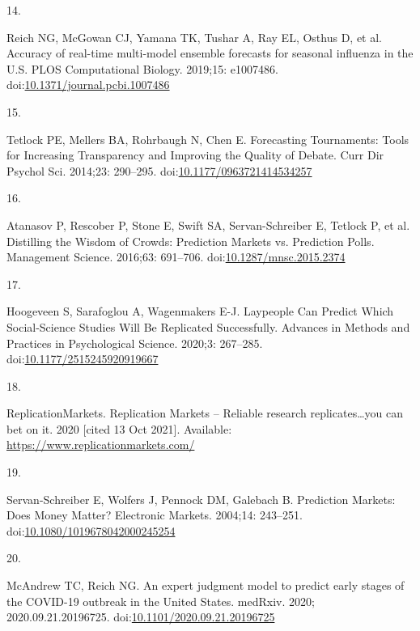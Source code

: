 \documentclass[10pt,letterpaper]{article}
\newlength{\cslhangindent}
\newlength{\csllabelwidth}
\newlength{\cslentryspacingunit} %
\newenvironment{CSLReferences}[2] %
 {%
  \setlength{\parindent}{0pt}
  \ifodd #1
  \let\oldpar\par
  \def\par{\hangindent=\cslhangindent\oldpar}
  \fi
  \setlength{\parskip}{#2\cslentryspacingunit}
 }%
 {}
\newcommand{\CSLLeftMargin}[1]{\parbox[t]{\csllabelwidth}{#1}}
\newcommand{\CSLRightInline}[1]{\parbox[t]{\linewidth - \csllabelwidth}{#1}\break}
\begin{document}
\begin{CSLReferences}{0}{0}
\leavevmode{}%
\CSLLeftMargin{14. }%
\CSLRightInline{Reich NG, McGowan CJ, Yamana TK, Tushar A, Ray EL,
Osthus D, et al. Accuracy of real-time multi-model ensemble forecasts
for seasonal influenza in the {U}.{S}. PLOS Computational Biology.
2019;15: e1007486.
doi:\href{https://doi.org/10.1371/journal.pcbi.1007486}{10.1371/journal.pcbi.1007486}}

\leavevmode{}%
\CSLLeftMargin{15. }%
\CSLRightInline{Tetlock PE, Mellers BA, Rohrbaugh N, Chen E. Forecasting
{Tournaments}: {Tools} for {Increasing Transparency} and {Improving} the
{Quality} of {Debate}. Curr Dir Psychol Sci. 2014;23: 290--295.
doi:\href{https://doi.org/10.1177/0963721414534257}{10.1177/0963721414534257}}

\leavevmode{}%
\CSLLeftMargin{16. }%
\CSLRightInline{Atanasov P, Rescober P, Stone E, Swift SA,
Servan-Schreiber E, Tetlock P, et al. Distilling the {Wisdom} of
{Crowds}: {Prediction Markets} vs. {Prediction Polls}. Management
Science. 2016;63: 691--706.
doi:\href{https://doi.org/10.1287/mnsc.2015.2374}{10.1287/mnsc.2015.2374}}

\leavevmode{}%
\CSLLeftMargin{17. }%
\CSLRightInline{Hoogeveen S, Sarafoglou A, Wagenmakers E-J. Laypeople
{Can Predict Which Social-Science Studies Will Be Replicated
Successfully}. Advances in Methods and Practices in Psychological
Science. 2020;3: 267--285.
doi:\href{https://doi.org/10.1177/2515245920919667}{10.1177/2515245920919667}}

\leavevmode{}%
\CSLLeftMargin{18. }%
\CSLRightInline{ReplicationMarkets. Replication {Markets} -- {Reliable}
research replicates\ldots you can bet on it. 2020 {[}cited 13 Oct
2021{]}. Available: \url{https://www.replicationmarkets.com/}}

\leavevmode{}%
\CSLLeftMargin{19. }%
\CSLRightInline{Servan-Schreiber E, Wolfers J, Pennock DM, Galebach B.
Prediction {Markets}: {Does Money Matter}? Electronic Markets. 2004;14:
243--251.
doi:\href{https://doi.org/10.1080/1019678042000245254}{10.1080/1019678042000245254}}

\leavevmode{}%
\CSLLeftMargin{20. }%
\CSLRightInline{McAndrew TC, Reich NG. An expert judgment model to
predict early stages of the {COVID-19} outbreak in the {United States}.
medRxiv. 2020; 2020.09.21.20196725.
doi:\href{https://doi.org/10.1101/2020.09.21.20196725}{10.1101/2020.09.21.20196725}}


\end{CSLReferences}
\end{document}
